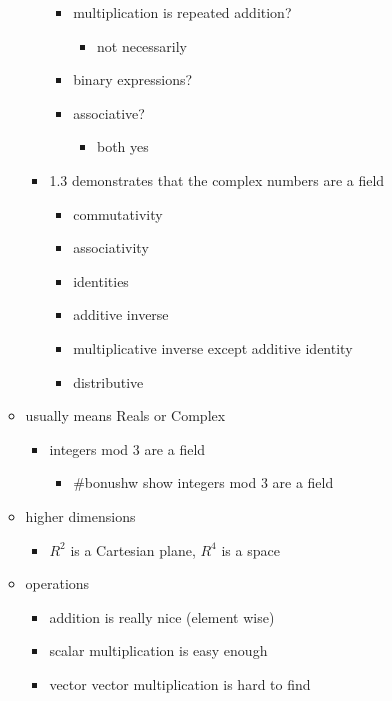 \documentclass[letterpaper]{article}
\begin{document}
\begin{itemize}
\begin{itemize}
\begin{itemize}
\begin{itemize}
\item multiplication is repeated addition?

\begin{itemize}
\item not necessarily
\end{itemize}

\item binary expressions?
\item associative?

\begin{itemize}
\item both yes
\end{itemize}
\end{itemize}

\item 1.3 demonstrates that the complex numbers are a field

\begin{itemize}
\item commutativity
\item associativity
\item identities
\item additive inverse
\item multiplicative inverse except additive identity
\item distributive
\end{itemize}
\end{itemize}

\item usually means Reals or Complex

\begin{itemize}
\item integers mod 3 are a field

\begin{itemize}
\item \#bonushw show integers mod 3 are a field
\end{itemize}
\end{itemize}

\item higher dimensions

\begin{itemize}
\item \(R^2\) is a Cartesian plane, \(R^4\) is a space
\end{itemize}

\item operations

\begin{itemize}
\item addition is really nice (element wise)
\item scalar multiplication is easy enough
\item vector vector multiplication is hard to find
\end{itemize}
\end{itemize}


\end{itemize}
\end{document}
